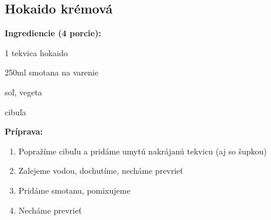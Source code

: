 \setcounter{step}{0}

\subsection{ Hokaido krémová }

\begin{ingredient}
  
  \def\portions{  }
  \textbf{ {\normalsize Ingrediencie (4 porcie):} }

  \begin{main}
      \item 1 tekvica hokaido
      \item 250ml smotana na varenie
      \item soľ, vegeta
      \item cibuľa
  \end{main}
  
\end{ingredient}
\begin{recipe}
\textbf{ {\normalsize Príprava:} }
\begin{enumerate}

  \item{Popražíme cibuľu a pridáme umytú nakrájanú tekvicu (aj so šupkou)}
  \item{Zalejeme vodou, dochutíme, necháme prevrieť}
  \item{Pridáme smotanu, pomixujeme}
  \item{Necháme prevrieť}

\end{enumerate}
\end{recipe}

\begin{notes}
  
\end{notes}	
\clearpage
